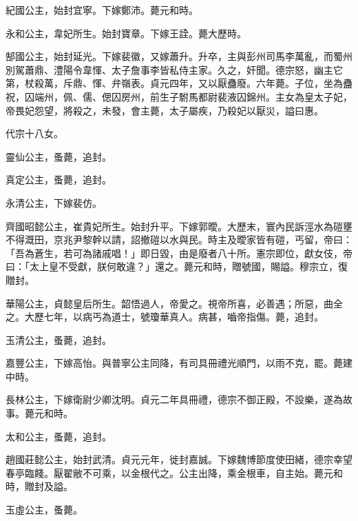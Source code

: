\begin{pinyinscope}
 紀國公主，始封宜寧。下嫁鄭沛。薨元和時。



 永和公主，韋妃所生。始封寶章。下嫁王詮。薨大歷時。



 郜國公主，始封延光。下嫁裴徽，又嫁蕭升。升卒，主與彭州司馬李萬亂，而蜀州別駕蕭鼎、澧陽令韋惲、太子詹事李皆私侍主家。久之，奸聞。德宗怒，幽主它第，杖殺萬，斥鼎、惲、弁嶺表。貞元四年，又以厭蠱廢。六年薨。子位，坐為蠱祝，囚端州，佩、儒、偲囚房州，前生子駙馬都尉裴液囚錦州。主女為皇太子妃，帝畏妃怨望，將殺之，未發，會主薨，太子屬疾，乃殺妃以厭災，謚曰惠。



 代宗十八女。



 靈仙公主，蚤薨，追封。



 真定公主，蚤薨，追封。



 永清公主，下嫁裴仿。



 齊國昭懿公主，崔貴妃所生。始封升平。下嫁郭曖。大歷末，寰內民訴涇水為磑壅不得溉田，京兆尹黎幹以請，詔撤磑以水與民。時主及曖家皆有磑，丐留，帝曰：「吾為蒼生，若可為諸戚唱！」即日毀，由是廢者八十所。憲宗即位，獻女伎，帝曰：「太上皇不受獻，朕何敢違？」還之。薨元和時，贈號國，賜謚。穆宗立，復贈封。



 華陽公主，貞懿皇后所生。韶悟過人，帝愛之。視帝所喜，必善遇；所惡，曲全之。大歷七年，以病丐為道士，號瓊華真人。病甚，嚙帝指傷。薨，追封。



 玉清公主，蚤薨，追封。



 嘉豐公主，下嫁高怡。與普寧公主同降，有司具冊禮光順門，以雨不克，罷。薨建中時。



 長林公主，下嫁衛尉少卿沈明。貞元二年具冊禮，德宗不御正殿，不設樂，遂為故事。薨元和時。



 太和公主，蚤薨，追封。



 趙國莊懿公主，始封武清。貞元元年，徙封嘉誠。下嫁魏博節度使田緒，德宗幸望春亭臨餞。厭翟敝不可乘，以金根代之。公主出降，乘金根車，自主始。薨元和時，贈封及謚。



 玉虛公主，蚤薨。




\end{pinyinscope}

